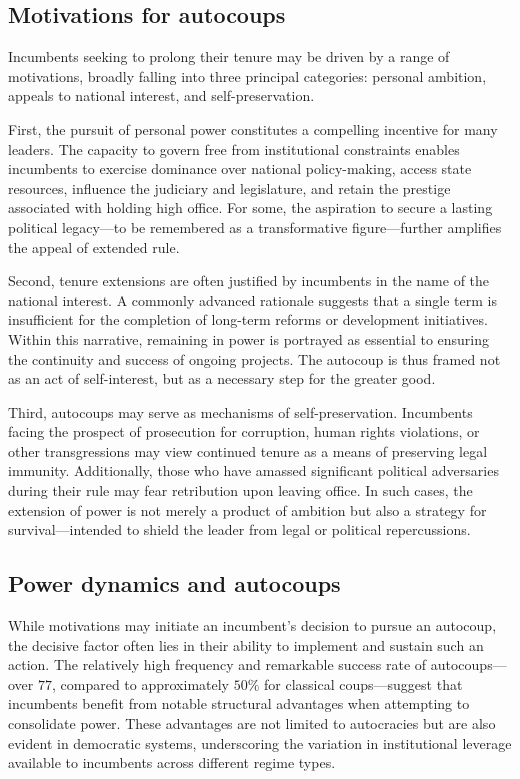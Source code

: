 \documentclass[
  12pt,
]{report}
\begin{document}
\subsection*{Motivations for autocoups}\label{motivations-for-autocoups}

Incumbents seeking to prolong their tenure may be driven by a range of
motivations, broadly falling into three principal categories: personal
ambition, appeals to national interest, and self-preservation.

First, the pursuit of personal power constitutes a compelling incentive
for many leaders. The capacity to govern free from institutional
constraints enables incumbents to exercise dominance over national
policy-making, access state resources, influence the judiciary and
legislature, and retain the prestige associated with holding high
office. For some, the aspiration to secure a lasting political
legacy---to be remembered as a transformative figure---further amplifies
the appeal of extended rule.

Second, tenure extensions are often justified by incumbents in the name
of the national interest. A commonly advanced rationale suggests that a
single term is insufficient for the completion of long-term reforms or
development initiatives. Within this narrative, remaining in power is
portrayed as essential to ensuring the continuity and success of ongoing
projects. The autocoup is thus framed not as an act of self-interest,
but as a necessary step for the greater good.

Third, autocoups may serve as mechanisms of self-preservation.
Incumbents facing the prospect of prosecution for corruption, human
rights violations, or other transgressions may view continued tenure as
a means of preserving legal immunity. Additionally, those who have
amassed significant political adversaries during their rule may fear
retribution upon leaving office. In such cases, the extension of power
is not merely a product of ambition but also a strategy for
survival---intended to shield the leader from legal or political
repercussions.

\subsection*{Power dynamics and
autocoups}\label{power-dynamics-and-autocoups}

While motivations may initiate an incumbent's decision to pursue an
autocoup, the decisive factor often lies in their ability to implement
and sustain such an action. The relatively high frequency and remarkable
success rate of autocoups---over \(77%
\), compared to approximately \(50\%\) for classical coups---suggest
that incumbents benefit from notable structural advantages when
attempting to consolidate power. These advantages are not limited to
autocracies but are also evident in democratic systems, underscoring the
variation in institutional leverage available to incumbents across
different regime types.
\end{document}
